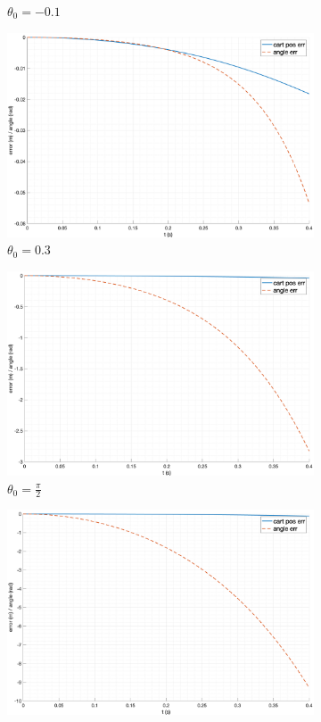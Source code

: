 \begin{figure}[ht!]
\begin{subfigure}[b]{0.45\textwidth}
        \caption{$\theta_0 = -0.1$}
    \end{subfigure}
    \begin{subfigure}[b]{0.45\textwidth}
        \includegraphics[width=\textwidth]{media/plots/free_motion/err_4.png}
        \caption{$\theta_0 = 0.3$}
    \end{subfigure}
    \begin{subfigure}[b]{0.45\textwidth}
        \includegraphics[width=\textwidth]{media/plots/free_motion/err_5.png}
        \caption{$\theta_0 = \frac{\pi}{2}$}
    \end{subfigure}
    \begin{subfigure}[b]{0.45\textwidth}
        \includegraphics[width=\textwidth]{media/plots/free_motion/err_6.png}

\end{subfigure}
\end{figure}
